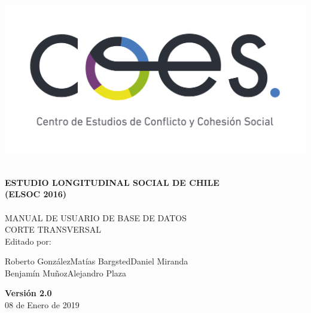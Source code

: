 \begin{titlepage}
	\centering
	\includegraphics[width=16cm]{coes_blanco_esp.jpg}

\HRule{1.4pt} \\
\LARGE \textbf{\uppercase{Estudio Longitudinal Social de Chile}}\\
\LARGE \textbf{\uppercase{(ELSOC 2016)}}\\

\HRule{1.4pt} \\ [0.2cm]

\normalsize  \vspace*{0.2\baselineskip}
 \large \textsc{MANUAL DE USUARIO DE BASE DE DATOS\\ 	CORTE TRANSVERSAL}
\\ [0.2cm]
\vspace*{0.9cm}
Editado por:\\
\begin{center}
Roberto González\hspace*{1.25cm}Matías Bargsted\hspace*{1.25cm}Daniel Miranda\\
Benjamín Muñoz\hspace*{1.5cm}Alejandro Plaza\\
\end{center}
\vspace*{1.3cm}
\textbf{Versión 2.0}\\
08 de Enero de  2019\\
\end{titlepage}

\newpage

\thispagestyle{empty}
\begin{minipage}[b]{1\linewidth}
    \tableofcontents
\end{minipage}

\begin{minipage}[b]{1\linewidth}
    \listoftables
\end{minipage}

\begin{minipage}[b]{1\linewidth}
    \listoffigures
\end{minipage}
